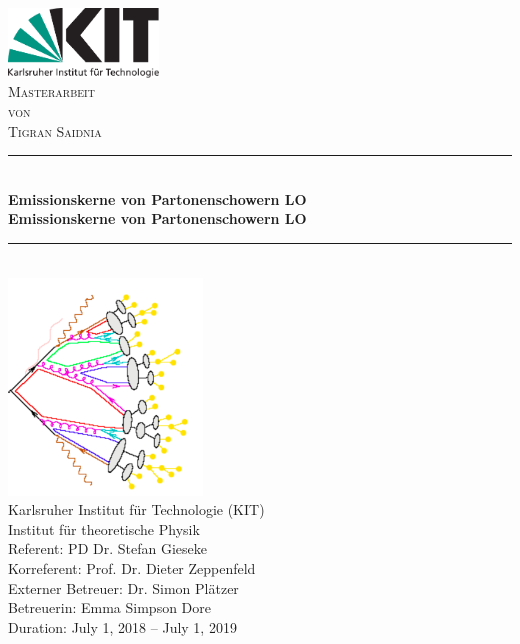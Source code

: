\begin{titlepage}

\begin{center}


\includegraphics[width=0.3\textwidth]{images/Intro/kitlogo_de_rgb}\\[1cm]    

\textsc{\LARGE Masterarbeit}\\[0.5cm]
\textsc{\Large von}\\[0.5cm]
\textsc{\Large Tigran Saidnia}\\[1.0cm]


\newcommand{\HRule}{\rule{\linewidth}{0.5mm}}
\HRule \\[0.8mm]
{\textbf{\Large \bfseries Emissionskerne von Partonenschowern LO}}\\[0.8mm]

{\textbf{\bfseries Emissionskerne von Partonenschowern LO}}\\[0.8mm]

\HRule \\[1cm]
\includegraphics[scale=0.7]{images/Intro/footPicture.PNG}\\[0.8cm]   

\Large Karlsruher Institut für Technologie (KIT)\\[1.5mm]
\Large Institut für theoretische Physik\\[1.0cm]

{\Large Referent: PD Dr. Stefan Gieseke \\
\Large Korreferent: Prof. Dr. Dieter Zeppenfeld\\
\Large Externer Betreuer: Dr. Simon Plätzer\\
\Large Betreuerin: Emma Simpson Dore}\\[0.8cm]   

Duration: July 1, 2018  –  July 1, 2019

\vfill


\end{center}

\end{titlepage}